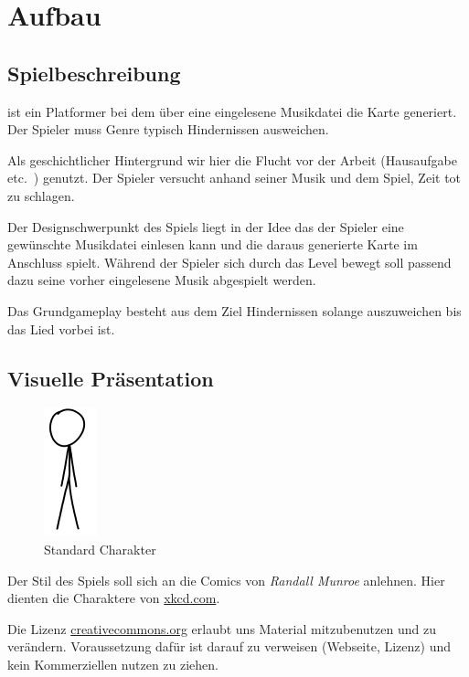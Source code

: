 \documentclass[Skript.tex]{subfiles}
\begin{document}
\section{Aufbau}

\subsection{Spielbeschreibung}

\gname ist ein Platformer bei dem über eine eingelesene Musikdatei die Karte generiert.
Der Spieler muss Genre typisch Hindernissen ausweichen.

Als geschichtlicher Hintergrund wir hier die Flucht vor der Arbeit (Hausaufgabe etc.\ ) genutzt. 
Der Spieler versucht anhand seiner Musik und dem Spiel, Zeit tot zu schlagen.

Der Designschwerpunkt des Spiels \gname liegt in der Idee das der Spieler eine gewünschte Musikdatei einlesen kann und die daraus generierte Karte im Anschluss spielt. 
Während der Spieler sich durch das Level bewegt soll passend dazu seine vorher eingelesene Musik abgespielt werden.

Das Grundgameplay besteht aus dem Ziel Hindernissen solange auszuweichen bis das Lied vorbei ist. 

\subsection{Visuelle Präsentation}
\begin{figure}
\vspace{-1.2cm}
  \begin{center}
    \includegraphics[scale=.9]{sketch/char.png}
	\caption{Standard Charakter}
	\label{charakter}
  \end{center}
\end{figure}

Der Stil des Spiels \gname soll sich an die Comics von \textit{Randall Munroe} anlehnen.
Hier dienten die Charaktere von \href{http://xkcd.com}{xkcd.com}.




Die Lizenz \href{http://creativecommons.org/licenses/by-nc/2.5/}{creativecommons.org} erlaubt uns Material mitzubenutzen und  zu verändern.
Voraussetzung dafür ist darauf zu verweisen (Webseite, Lizenz) und kein Kommerziellen nutzen zu ziehen.
\end{document}
